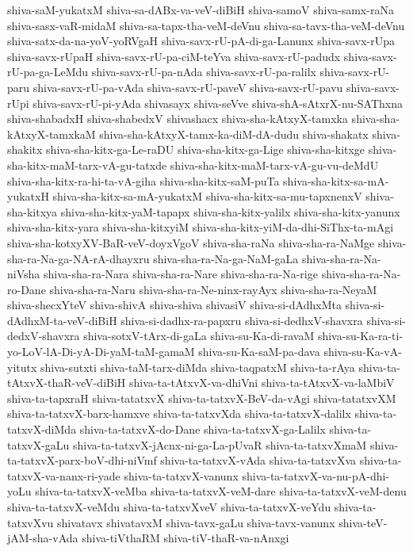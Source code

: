{shiva-saM-yukatxM
shiva-sa-dABx-va-veV-diBiH
shiva-samoV
shiva-samx-raNa
shiva-sasx-vaR-midaM
shiva-sa-tapx-tha-veM-deVnu
shiva-sa-tavx-tha-veM-deVnu
shiva-satx-da-na-yoV-yoRVgaH
shiva-savx-rU-pA-di-ga-Lanunx
shiva-savx-rUpa
shiva-savx-rUpaH
shiva-savx-rU-pa-ciM-teYva
shiva-savx-rU-padudx
shiva-savx-rU-pa-ga-LeMdu
shiva-savx-rU-pa-nAda
shiva-savx-rU-pa-ralilx
shiva-savx-rU-paru
shiva-savx-rU-pa-vAda
shiva-savx-rU-paveV
shiva-savx-rU-pavu
shiva-savx-rUpi
shiva-savx-rU-pi-yAda
shivasayx
shiva-seVve
shiva-shA-sAtxrX-nu-SAThxna
shiva-shabadxH
shiva-shabedxV
shivashacx
shiva-sha-kAtxyX-tamxka
shiva-sha-kAtxyX-tamxkaM
shiva-sha-kAtxyX-tamx-ka-diM-dA-dudu
shiva-shakatx
shiva-shakitx
shiva-sha-kitx-ga-Le-raDU
shiva-sha-kitx-ga-Lige
shiva-sha-kitxge
shiva-sha-kitx-maM-tarx-vA-gu-tatxde
shiva-sha-kitx-maM-tarx-vA-gu-vu-deMdU
shiva-sha-kitx-ra-hi-ta-vA-giha
shiva-sha-kitx-saM-puTa
shiva-sha-kitx-sa-mA-yukatxH
shiva-sha-kitx-sa-mA-yukatxM
shiva-sha-kitx-sa-mu-tapxnenxV
shiva-sha-kitxya
shiva-sha-kitx-yaM-tapapx
shiva-sha-kitx-yalilx
shiva-sha-kitx-yanunx
shiva-sha-kitx-yara
shiva-sha-kitxyiM
shiva-sha-kitx-yiM-da-dhi-SiThx-ta-mAgi
shiva-sha-kotxyXV-BaR-veV-doyxVgoV
shiva-sha-raNa
shiva-sha-ra-NaMge
shiva-sha-ra-Na-ga-NA-rA-dhayxru
shiva-sha-ra-Na-ga-NaM-gaLa
shiva-sha-ra-Na-niVsha
shiva-sha-ra-Nara
shiva-sha-ra-Nare
shiva-sha-ra-Na-rige
shiva-sha-ra-Na-ro-Dane
shiva-sha-ra-Naru
shiva-sha-ra-Ne-ninx-rayAyx
shiva-sha-ra-NeyaM
shiva-shecxYteV
shiva-shivA
shiva-shiva
shivasiV
shiva-si-dAdhxMta
shiva-si-dAdhxM-ta-veV-diBiH
shiva-si-dadhx-ra-papxru
shiva-si-dedhxV-shavxra
shiva-si-dedxV-shavxra
shiva-sotxV-tArx-di-gaLa
shiva-su-Ka-di-ravaM
shiva-su-Ka-ra-ti-yo-LoV-lA-Di-yA-Di-yaM-taM-gamaM
shiva-su-Ka-saM-pa-dava
shiva-su-Ka-vA-yitutx
shiva-sutxti
shiva-taM-tarx-diMda
shiva-taqpatxM
shiva-ta-rAya
shiva-ta-tAtxvX-thaR-veV-diBiH
shiva-ta-tAtxvX-va-dhiVni
shiva-ta-tAtxvX-va-laMbiV
shiva-ta-tapxraH
shiva-tatatxvX
shiva-ta-tatxvX-BeV-da-vAgi
shiva-tatatxvXM
shiva-ta-tatxvX-barx-hamxve
shiva-ta-tatxvXda
shiva-ta-tatxvX-dalilx
shiva-ta-tatxvX-diMda
shiva-ta-tatxvX-do-Dane
shiva-ta-tatxvX-ga-Lalilx
shiva-ta-tatxvX-gaLu
shiva-ta-tatxvX-jAcnx-ni-ga-La-pUvaR
shiva-ta-tatxvXmaM
shiva-ta-tatxvX-parx-boV-dhi-niVmf
shiva-ta-tatxvX-vAda
shiva-ta-tatxvXva
shiva-ta-tatxvX-va-nanx-ri-yade
shiva-ta-tatxvX-vanunx
shiva-ta-tatxvX-va-nu-pA-dhi-yoLu
shiva-ta-tatxvX-veMba
shiva-ta-tatxvX-veM-dare
shiva-ta-tatxvX-veM-denu
shiva-ta-tatxvX-veMdu
shiva-ta-tatxvXveV
shiva-ta-tatxvX-veYdu
shiva-ta-tatxvXvu
shivatavx
shivatavxM
shiva-tavx-gaLu
shiva-tavx-vanunx
shiva-teV-jAM-sha-vAda
shiva-tiVthaRM
shiva-tiV-thaR-va-nAnxgi
}
